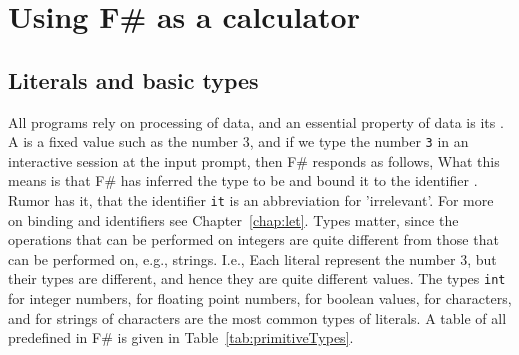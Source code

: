 \chapter{Using F\# as a calculator}
\label{chap:calculator}
\section{Literals and basic types}
All programs rely on processing of data, and an essential property of data is its . A  is a fixed value such as the number 3, and if we type the number \lstinline!3! in an interactive session at the input prompt, then F\# responds as follows,
%
%
What this means is that F\# has inferred the type to be  and bound it to the identifier . Rumor has it, that the identifier \lstinline|it| is an abbreviation for 'irrelevant'. For more on binding and identifiers see Chapter~\ref{chap:let}. Types matter, since the operations that can be performed on integers are quite different from those that can be performed on, e.g., strings. I.e.,
%
%
Each literal represent the number 3, but their types are different, and hence they are quite different values. The types \lstinline!int! for integer numbers,  for floating point numbers,  for boolean values,  for characters, and  for strings of characters are the most common types of literals. A table of all  predefined in F\# is given in Table~\ref{tab:primitiveTypes}.
